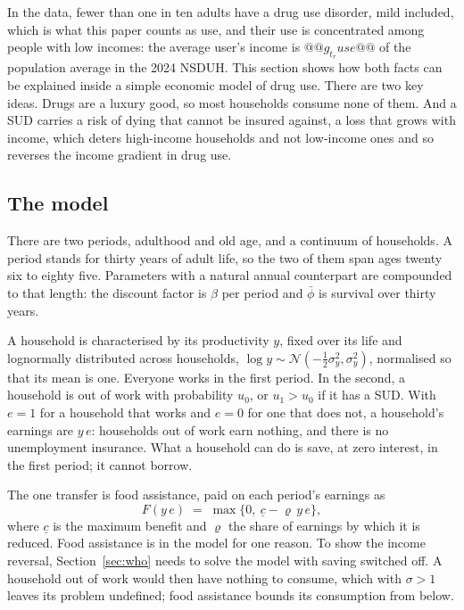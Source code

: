 \documentclass[10pt]{article}
\begin{document}
In the data, fewer than one in ten adults have a drug use disorder, mild included, which is what this paper counts as use, and their use is concentrated among people with low incomes: the average user's income is $@@g_t_ruse@@$ of the population average in the 2024 NSDUH. This section shows how both facts can be explained inside a simple economic model of drug use. There are two key ideas. Drugs are a luxury good, so most households consume none of them. And a SUD carries a risk of dying that cannot be insured against, a loss that grows with income, which deters high-income households and not low-income ones and so reverses the income gradient in drug use.

\subsection{The model}\label{sec:env}

There are two periods, adulthood and old age, and a continuum of households. A period stands for
thirty years of adult life, so the two of them span ages twenty six to eighty five.
Parameters with a natural annual counterpart are compounded to that length: the
discount factor is $\beta$ per period and $\bar\phi$ is survival over thirty years.

A household is characterised by its productivity $y$, fixed over its life and lognormally distributed across households, $\log y \sim \mathcal{N}(-\tfrac12\sigma_y^2, \sigma_y^2)$, normalised so that its mean is one. Everyone works in the first period. In the second, a household is out of work with probability $u_0$, or $u_1>u_0$ if it has a SUD. With $e=1$ for a household that works and $e=0$ for one that does not, a household's earnings are $y\,e$: households out of work earn nothing, and there is no unemployment insurance. What a household can do is save, at zero interest, in the first period; it cannot borrow.

The one transfer is food assistance, paid on each period's earnings as
\begin{equation}\label{eq:fs}
F(y\,e) \;=\; \max\{0,\ \underline c-\varrho\, y\,e\},
\end{equation}
where $\underline c$ is the maximum benefit and $\varrho$ the share of earnings by which it is reduced. Food assistance is in the model for one reason. To show the income reversal, Section~\ref{sec:who} needs to solve the model with saving switched off. A household out of work would then have nothing to consume, which with $\sigma>1$ leaves its problem undefined; food assistance bounds its consumption from below.
\end{document}
